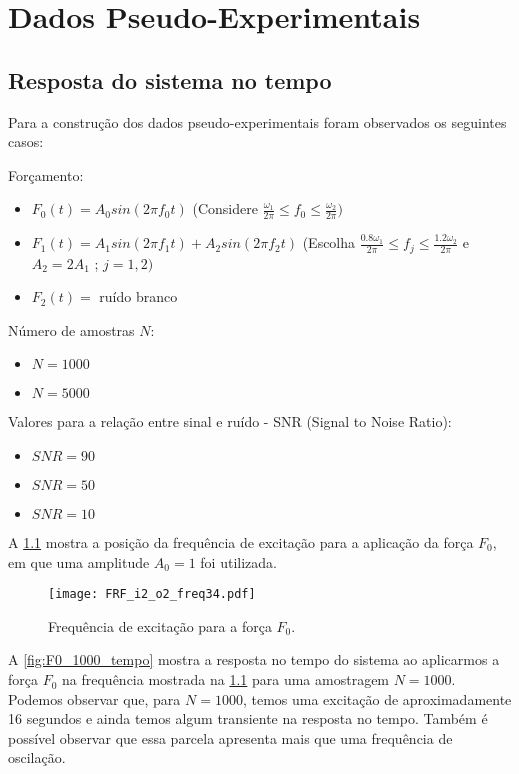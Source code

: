 \chapter{Dados Pseudo-Experimentais}

\section{Resposta do sistema no tempo} \label{Resposta do sistema no tempo}

Para a construção dos dados pseudo-experimentais foram observados os seguintes casos:

Forçamento:
\begin{itemize}
	\item $F_0(t) = A_0 sin(2\pi f_0 t)$ 
	(Considere $\frac{\omega_1}{2\pi} \leq f_0 \leq \frac{\omega_2}{2\pi})$ 
	\item $F_1(t) = A_1 sin(2\pi f_1 t) + A_2 sin(2\pi f_2 t)$ 
	(Escolha 
	$\frac{0.8 \omega_1}{2\pi} \leq f_j \leq \frac{1.2 \omega_2}{2\pi}$ 
	e
	$A_2 = 2A_1$
	;
	$ j = 1, 2)$
	\item $F_2(t) = $ ruído branco
\end{itemize}

Número de amostras $N$:
\begin{itemize}
	\item $N = 1000$
	\item $N = 5000$
\end{itemize}

Valores para a relação entre sinal e ruído -  SNR (Signal to Noise Ratio):
\begin{itemize}
	\item $SNR = 90$
	\item $SNR = 50$
	\item $SNR = 10$
\end{itemize}

A \cref{fig:FRF_i2_o2_freq34} mostra a posição da frequência de excitação para a aplicação da força $F_0$, em que uma amplitude $A_0 = 1$ foi utilizada.

\begin{figure}
	\centering
	\texttt{[image: FRF\_i2\_o2\_freq34.pdf]}
	\caption{Frequência de excitação para a força $F_0$.}
	\label{fig:FRF_i2_o2_freq34}
\end{figure}

A \cref{fig:F0_1000_tempo} mostra a resposta no tempo do sistema ao aplicarmos a força $F_0$ na frequência mostrada na \cref{fig:FRF_i2_o2_freq34} para uma amostragem $N = 1000$. Podemos observar que, para $N=1000$, temos uma excitação de aproximadamente 16 segundos e ainda temos algum transiente na resposta no tempo. Também é possível observar que essa parcela apresenta mais que uma frequência de oscilação.

